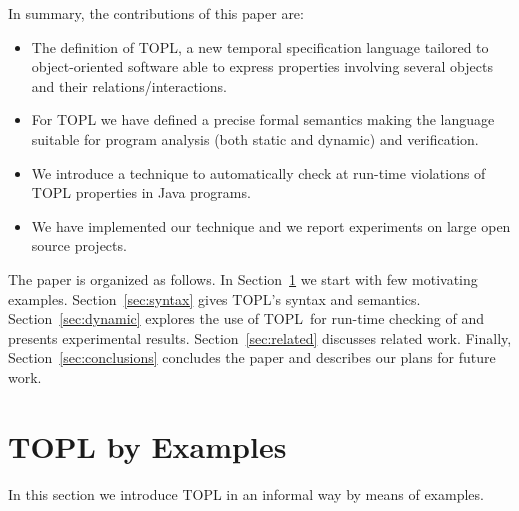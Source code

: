 \documentclass{llncs} %
\newcommand{\TPL}{TOPL}
\begin{document}
In summary, the contributions of this paper are:
\begin{itemize}
\item The definition of TOPL, a new temporal specification language tailored to object-oriented software able to express properties involving several objects and their relations/interactions.
\item For TOPL we have defined a precise formal semantics making the language suitable for program analysis (both static and dynamic) and verification. 
\item We introduce a technique to automatically check at run-time violations of TOPL properties in Java programs.
\item We have implemented our technique and we report experiments on large open source projects.
\end{itemize}

The paper is organized as follows. In Section~\ref{sec:examples} we start with few motivating examples.
Section~\ref{sec:syntax} gives  \TPL's syntax  and semantics.
Section~\ref{sec:dynamic} explores the use of \TPL \ for run-time checking of and presents experimental results. Section~\ref{sec:related} discusses related work.
Finally, Section~\ref{sec:conclusions} concludes the paper and describes our plans for future work.




\section{TOPL by Examples} \label{sec:examples} %
In this section we introduce TOPL in an informal way by means of examples.
\end{document}
